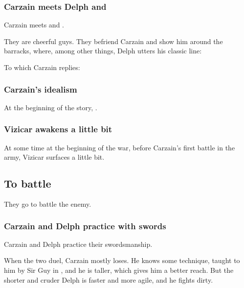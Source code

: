 \subsubsection{Carzain meets Delph and \Tsekkect}

\begin{garbage}
Carzain meets  and \hs{\Tsekkect}.

They are cheerful guys. 
They befriend Carzain and show him around the barracks, where, among other things, Delph utters his classic line: 

To which Carzain replies: 






\subsubsection{Carzain's idealism}
At the beginning of the story, .





\subsubsection{Vizicar awakens a little bit}
At some time at the beginning of the war, before Carzain's first battle in the army, Vizicar surfaces a little bit. 









\subsection{To battle}
They go to battle the enemy. 





\subsubsection{Carzain and Delph practice with swords}
Carzain and Delph practice their swordsmanship. 

When the two duel, Carzain mostly loses. He knows some technique, taught to him by Sir Guy in \Redglen, and he is taller, which gives him a better reach. But the shorter and cruder Delph is faster and more agile, and he fights dirty. 


\end{garbage}
